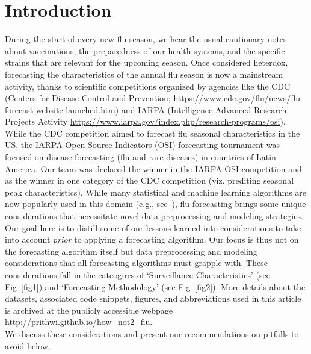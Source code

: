 \documentclass[10pt,letterpaper]{article}
\newcommand{\narenc}[1]{{\color{black}\textrm{#1}}}
\begin{document}
\section*{Introduction}
\narenc{During the start of every new flu season, we hear the usual cautionary
notes about vaccinations, the preparedness of our health systems, and the
specific strains that are relevant for the upcoming season. Once considered
heterdox, forecasting the characteristics of the annual flu season is now a
mainstream activity, thanks to scientific competitions organized by agencies
like the CDC (Centers for Disease Control and Prevention;
\url{https://www.cdc.gov/flu/news/flu-forecast-website-launched.htm}) and IARPA
(Intelligence Advanced Research Projects Activity
\url{https://www.iarpa.gov/index.php/research-programs/osi}).} While the CDC
competition aimed to forecast flu seasonal characteristics in the US, the IARPA
Open Source Indicators (OSI) forecasting tournament was focused on disease
forecasting (flu and rare diseases) in countries of Latin America.  Our team
was declared the winner in the IARPA OSI competition and \narenc{as the winner
in one category of the CDC competition (viz.  prediting seasonal peak
characteristics).  While many statistical and machine learning algorithms are
now popularly used in this domain (e.g.,
see~\cite{chakraborty2014forecasting,shaman2013real,goldstein2011predicting}),
flu forecasting brings some unique considerations that necessitate novel data
preprocessing and modeling strategies.  Our goal here is to distill some of our
lessons learned into considerations to take into account {\it prior} to
applying a forecasting algorithm. Our focus is thus not on the forecasting
algorithm itself but data preprocessing and modeling considerations that all
forecasting algorithms must grapple with. These considerations fall in the
cateogires of `Surveillance Characteristics' (see Fig~\ref{fig1}) and
`Forecasting Methodology' (see Fig~\ref{fig2}). 
More details about the datasets, associated code snippets, figures, and abbreviations
used in this article is archived at the
publicly accessible webpage \url{http://prithwi.github.io/how_not2_flu}.
\\
We discuss these considerations
and present our recommendations on pitfalls to avoid below.}

\end{document}

